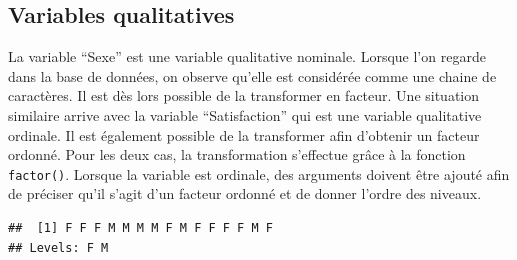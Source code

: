 \documentclass[
]{book}
\newenvironment{Shaded}{\begin{snugshade}}{\end{snugshade}}
\newcommand{\AttributeTok}[1]{\textcolor[rgb]{0.13,0.29,0.53}{#1}}
\newcommand{\ConstantTok}[1]{\textcolor[rgb]{0.56,0.35,0.01}{#1}}
\newcommand{\FunctionTok}[1]{\textcolor[rgb]{0.13,0.29,0.53}{\textbf{#1}}}
\newcommand{\NormalTok}[1]{#1}
\newcommand{\OtherTok}[1]{\textcolor[rgb]{0.56,0.35,0.01}{#1}}
\newcommand{\SpecialCharTok}[1]{\textcolor[rgb]{0.81,0.36,0.00}{\textbf{#1}}}
\newcommand{\StringTok}[1]{\textcolor[rgb]{0.31,0.60,0.02}{#1}}
\begin{document}
\subsection{Variables qualitatives}\label{variables-qualitatives}

La variable ``Sexe'' est une variable qualitative nominale. Lorsque l'on regarde dans la base de données, on observe qu'elle est considérée comme une chaine de caractères. Il est dès lors possible de la transformer en facteur. Une situation similaire arrive avec la variable ``Satisfaction'' qui est une variable qualitative ordinale. Il est également possible de la transformer afin d'obtenir un facteur ordonné. Pour les deux cas, la transformation s'effectue grâce à la fonction \texttt{factor()}. Lorsque la variable est ordinale, des arguments doivent être ajouté afin de préciser qu'il s'agit d'un facteur ordonné et de donner l'ordre des niveaux.

\begin{Shaded}
\end{Shaded}

\begin{verbatim}
##  [1] F F F M M M M F M F F F F M F
## Levels: F M
\end{verbatim}

\begin{Shaded}
\end{Shaded}
\end{document}
